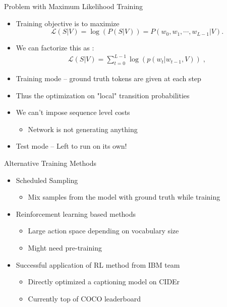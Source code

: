\documentclass{beamer}
\begin{document}
\begin{frame}{Problem with Maximum Likelihood Training}
\begin{itemize}
    \item Training objective is to maximize 
    \begin{equation}
            \label{eq:langB1}\mathcal{L}(S | V)  = \log(P(S|V)) = P(w_0, w_1, \cdots, w_{L-1}|V)  .
    \end{equation}
    \item We can factorize this as :
    \begin{align}
      \label{eqCost}
      \mathcal{L}(S | V) = \sum_{t=0}^{L-1} \log(p(w_t|w_{t-1},V)) \; ,
    \end{align}
    \item Training mode -- ground truth tokens are given at each step
    \item Thus the optimization on "local" transition probabilities
    \item We can't impose sequence level costs
        \begin{itemize}
            \item Network is not generating anything
        \end{itemize}
    \item Test mode -- Left to run on its own!
\end{itemize}
\end{frame}
\begin{frame}{Alternative Training Methods}
    \begin{itemize}
        \item Scheduled Sampling~\cite{bengio2015scheduled}
            \begin{itemize}
                \item Mix samples from the model with ground truth while training 
            \end{itemize}
        \item Reinforcement learning based methods
            \begin{itemize}
                \item Large action space depending on vocabulary size 
                \item Might need pre-training 
            \end{itemize}
            \item Successful application of RL method from IBM team~\cite{rennie2016self}
            \begin{itemize}
                \item Directly optimized a captioning model on CIDEr
                \item Currently top of COCO leaderboard
            \end{itemize}
    \end{itemize}
\end{frame}
\end{document}
